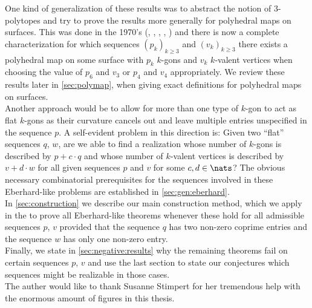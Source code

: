 One kind of generalization of these results was to abstract the notion of $3$-polytopes and try to prove the results more generally for polyhedral maps on surfaces. This was done in the 1970's (\cite{jendrol1977generalization}, \cite{jucovivc1973theorem}, \cite{barnette1971toroidal}, \cite{grunbaum1969planar}, \cite{zaks1971analogue}) and there is now a complete characterization for which sequences $(p_k)_{k\geq 3}$ and $(v_k)_{k \geq 3}$ there exists a polyhedral map on some surface with $p_k$ $k$-gons and $v_k$ $k$-valent vertices when choosing the value of $p_6$ and $v_3$ or $p_4$ and $v_4$ appropriately. We review these results later in \autoref{sec:polymap}, when giving exact definitions for polyhedral maps on surfaces.\\

Another approach would be to allow for more than one type of $k$-gon to act as flat $k$-gons as their curvature cancels out and leave multiple entries unspecified in the sequence $p$. A self-evident problem in this direction is: Given two ``flat'' sequences $q$, $w$, are we able to find a realization whose number of $k$-gons is described by $p + c\cdot q$ and whose number of $k$-valent vertices is described by $v + d\cdot w$ for all given sequences $p$ and $v$ for some $c, d \in \nats$? The obvious necessary combinatorial prerequisites for the sequences involved in these {\sc Eberhard}-like problems are established in \autoref{sec:gen:eberhard}.\\

In \autoref{sec:construction} we describe our main construction method, which we apply in the  to prove all {\sc Eberhard}-like theorems whenever these hold for all admissible sequences $p$, $v$ provided that the sequence $q$ has two non-zero coprime entries and the sequence $w$ has only one non-zero entry.\\

Finally, we state in \autoref{sec:negative:results} why the remaining theorems fail on certain sequences $p$, $v$ and use the last section to state our conjectures which sequences might be realizable in those cases.\\

\vspace{1.5cm}
The auther would like to thank Susanne Stimpert for her tremendous help with the enormous amount of figures in this thesis.